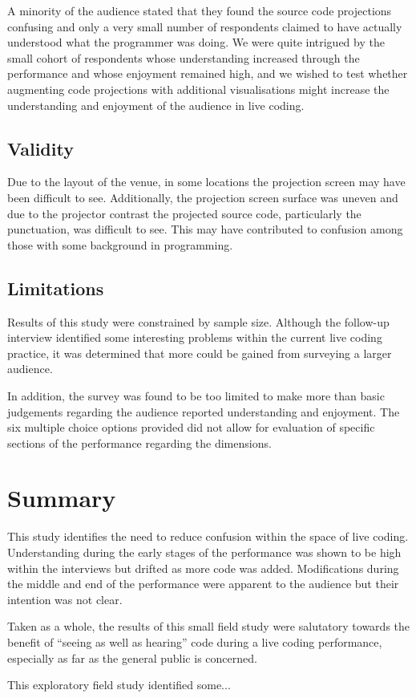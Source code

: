 A minority of the audience stated that they found the source code projections confusing and only a very small number of respondents claimed to have actually understood what the programmer was doing. We were quite intrigued by the small cohort of respondents whose understanding increased through the performance and whose enjoyment remained high, and we wished to test whether augmenting code projections with additional visualisations might increase the understanding and enjoyment of the audience in live coding. \fix

\subsection{Validity}

Due to the layout of the venue, in some locations the projection screen may have been difficult to see. Additionally, the projection screen surface was uneven and due to the projector contrast the projected source code, particularly the punctuation, was difficult to see. This may have contributed to confusion among those with some background in programming.

\more

\subsection{Limitations}

Results of this study were constrained by sample size. Although the follow-up interview identified some interesting problems within the current live coding practice, it was determined that more could be gained from surveying a larger audience.

In addition, the survey was found to be too limited to make more than basic judgements regarding the audience reported understanding and enjoyment. The six multiple choice options provided did not allow for evaluation of specific sections of the performance regarding the dimensions.

\section{Summary}

This study identifies the need to reduce confusion within the space of live coding. Understanding during the early stages of the performance was shown to be high within the interviews but drifted as more code was added. Modifications during the middle and end of the performance were apparent to the audience but their intention was not clear.

Taken as a whole, the results of this small field study were salutatory towards the benefit of ``seeing as well as hearing'' code during a live coding performance, especially as far as the general public is concerned. \fix

This exploratory field study identified some...\more


